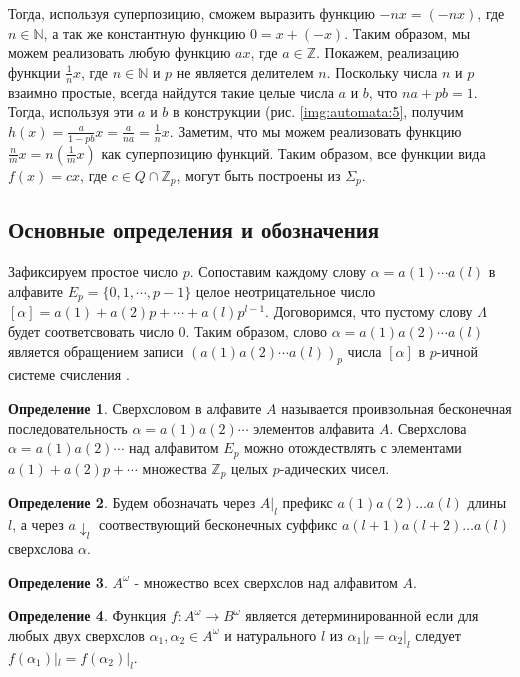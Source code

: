 \documentclass[och, master]{SCWorks}
\theoremstyle{plain}
\theoremstyle{plain}
\theoremstyle{plain}
\theoremstyle{definition}
\newtheorem{defn}{Определение}
\begin{document}
\noindent Тогда, используя суперпозицию, сможем выразить функцию $-nx=(-nx)$, где $n \in \mathbb N$, а так же константную функцию $0=x+(-x)$. Таким образом, мы можем реализовать любую функцию $ax$, где $a \in \mathbb Z$. Покажем, реализацию функции $\frac{1}{n}x$, где $n \in \mathbb N$ и $p$ не является делителем $n$. Поскольку числа $n$ и $p$ взаимно простые, всегда найдутся такие целые числа $a$ и $b$, что $na+pb=1$. Тогда, используя эти $a$ и $b$ в конструкции (рис. \ref{img:automata:5}, получим $h(x)=\frac{a}{1-pb}x=\frac{a}{na}=\frac{1}{n}x$. Заметим, что мы можем реализовать функцию $\frac{n}{m}x=n(\frac{1}{m}x)$ как суперпозицию функций. Таким образом, все функции вида $f(x)=cx$, где $c \in Q \cap \mathbb Z_p$, могут быть построены из $\Sigma_p$.

\subsection{Основные определения и обозначения}
Зафиксируем простое число $p$. Сопоставим каждому слову $\alpha=a(1)\cdots a(l)$ в алфавите $E_p=\{0,1,\cdots,p-1\}$ целое неотрицательное число $[\alpha]=a(1)+a(2)p+\cdots+a(l)p^{l-1}$. Договоримся, что пустому слову $\Lambda$ будет соответсвовать число $0$. Таким образом, слово $\alpha=a(1)a(2) \cdots a(l)$ является обращением записи $(a(1)a(2) \cdots a(l))_p$ числа $[\alpha]$ в $p$-ичной системе счисления \cite{bib:automata:tyapaev:2017,bib:automata:tyapaev:2018}.

\begin{defn} \cite{bib:automata:klapper}
Сверхсловом в алфавите $A$ называется проивзольная бесконечная последовательность $\alpha=a(1)a(2) \cdots$ элементов алфавита $A$. Сверхслова $\alpha=a(1)a(2) \cdots$ над алфавитом $E_p$ можно отождествлять с элементами $a(1)+a(2)p+\cdots$ множества $\mathbb Z_p$ целых $p$-адических чисел.
\end{defn}

\begin{defn} \cite{bib:automata:klapper}
Будем обозначать через $A|_l$ префикс $a(1)a(2)\ldots a(l)$ длины $l$, а через $a \downarrow_l$ соотвествующий бесконечных суффикс $a(l+1)a(l+2)\ldots a(l)$ сверхслова $\alpha$.
\end{defn}

\begin{defn}
$A^{\omega}$ - множество всех сверхслов над алфавитом $A$.	
\end{defn}

\begin{defn}
Функция $f: A^{\omega} \rightarrow B^{\omega}$ является детерминированной если для любых двух сверхслов $\alpha_1, \alpha_2 \in A^{\omega}$ и натурального $l$ из $\alpha_1|_l = \alpha_2|_l$ следует $f(\alpha_1)|_l = f(\alpha_2)|_l$.
\end{defn}
\end{document}
